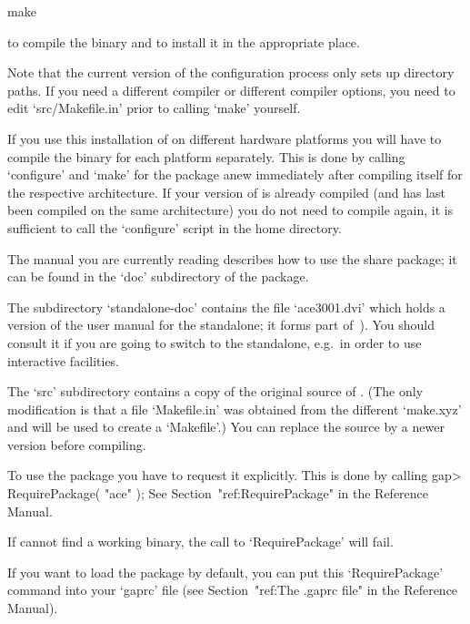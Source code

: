 \begintt
make
\endtt

to compile the binary and to install it in the appropriate place.

Note that the  current version of the configuration  process only sets
up  directory paths.  If you  need a  different compiler  or different
compiler options, you need  to edit `src/Makefile.in' prior to calling
`make' yourself.

If you use this installation of {\GAP} on different hardware platforms
you will have to compile the binary for each platform separately. This
is  done  by calling  `configure'  and  `make'  for the  package  anew
immediately   after  compiling  {\GAP}   itself  for   the  respective
architecture.  If your version of  {\GAP} is already compiled (and has
last  been compiled  on  the same  architecture)  you do  not need  to
compile {\GAP} again, it is  sufficient to call the `configure' script
in the {\GAP} home directory.

The manual you are currently reading describes how to use the   {\ACE}
share package; it can be found in the `doc' subdirectory of the package.

The subdirectory `standalone-doc' contains the file `ace3001.dvi' which
holds a version of the user manual for the {\ACE} standalone; it  forms
part of~\cite{HR99a}). You should consult it if you are going to switch
to the {\ACE} standalone, e.g.~in order to use interactive facilities.

The  `src' subdirectory  contains a  copy  of the  original source  of
{\ACE}.  (The  only modification  is  that  a  file `Makefile.in'  was
obtained from  the different `make.xyz' and  will be used  to create a
`Makefile'.)  You  can replace  the source by  a newer  version before
compiling.


To use  the {\ACE} package you  have to request it  explicitly. This is
done by calling
\begintt
gap> RequirePackage( "ace" );
\endtt
See Section~"ref:RequirePackage" in the {\GAP} Reference Manual.

If {\GAP} cannot find a working binary, the call to `RequirePackage' will
fail.

If you want to load the {\ACE} package by default, you can put this
`RequirePackage' command into your `gaprc' file
(see Section~"ref:The .gaprc file" in the {\GAP} Reference Manual).


